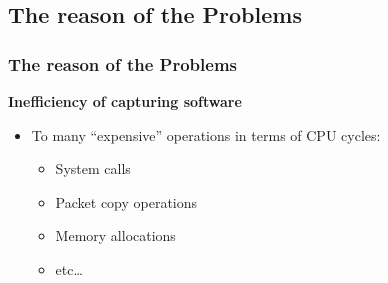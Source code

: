 \documentclass{beamer}
\begin{document}
\subsection*{The reason of the Problems}
\begin{frame}
\frametitle{The reason of the Problems}
\textbf{Inefficiency of  capturing software}\newline
\begin{itemize}
	\item To many "`expensive"' operations in terms of CPU cycles: 
\begin{itemize}
			\item System calls
			\item Packet copy operations
			\item Memory allocations
			\item etc\ldots\newline
\end{itemize}
\end{itemize}
\end{frame}
\end{document}
